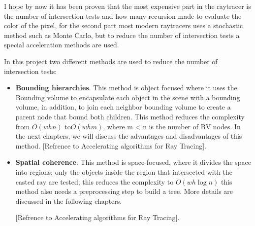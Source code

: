 \documentclass[11pt,a4paper]{article}
\begin{document}
 		I hope by now it has been proven that the most expensive part in the raytracer is the number of intersection tests and how many recursion made to evaluate the color of the pixel, for the second part most modern raytracers uses a stochastic method such as Monte Carlo, but to reduce the number of intersection tests a special acceleration methods are used.  
 		   
 		In this project two different methods are used to reduce the number of intersection tests:
 		
 		 	\begin{itemize}
 			\item 
 		\textbf{Bounding hierarchies}. This method is object focused where it uses the Bounding volume to encapsulate each object in the scene with a bounding volume, in addition, to join each neighbor bounding volume to create a parent node that bound both children. This method reduces the complexity from $  O(w h n) $ to$  O(w h m) $, where m < n is the number of BV nodes. In the next chapters, we will discuss the advantages and disadvantages of this method. [Refrence to Accelerating algorithms for Ray Tracing].
 		 
 		\item  \textbf{Spatial coherence}.
 		This method is space-focused, where it divides the space into regions; only the objects inside the region that intersected with the casted ray are tested; this reduces the complexity to $ O(w h \log  n) $ this method also needs a preprocessing step to build a tree. More details are discussed in the following chapters. 
 		
 		 [Refrence to Accelerating algorithms for Ray Tracing].
 		 	\end{itemize}
\end{document}
